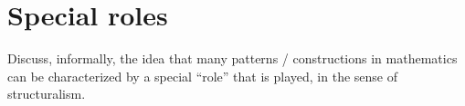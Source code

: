 
\section{Special roles}
\label{sec:special-roles}

Discuss, informally, the idea that many patterns / constructions in mathematics can be characterized by a special ``role'' that is played, in the sense of structuralism.

